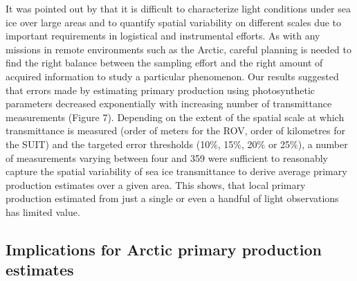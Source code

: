 It was pointed out by \citet{Nicolaus2013} that it is difficult to characterize light conditions under sea ice over large areas and to quantify spatial variability on different scales due to important requirements in logistical and instrumental efforts. As with any missions in remote environments such as the Arctic, careful planning is needed to find the right balance between the sampling effort and the right amount of acquired information to study a particular phenomenon. Our results suggested that errors made by estimating primary production using photosynthetic parameters decreased exponentially with increasing number of transmittance measurements (Figure 7). Depending on the extent of the spatial scale at which transmittance is measured (order of meters for the ROV, order of kilometres for the SUIT) and the targeted error thresholds (10\%, 15\%, 20\% or 25\%), a number of measurements varying between four and 359 were sufficient to reasonably capture the spatial variability of sea ice transmittance to derive average primary production estimates over a given area. This shows, that local primary production estimated from just a single or even a handful of light observations has limited value.

\subsection{Implications for Arctic primary production estimates}

